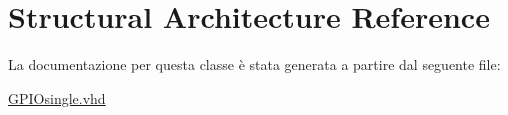 \hypertarget{class_g_p_i_osingle_1_1_structural}{\section{Structural Architecture Reference}
\label{class_g_p_i_osingle_1_1_structural}
}


La documentazione per questa classe è stata generata a partire dal seguente file\+:\begin{DoxyCompactItemize}
\item 
\hyperlink{_g_p_i_osingle_8vhd}{G\+P\+I\+Osingle.\+vhd}\end{DoxyCompactItemize}
